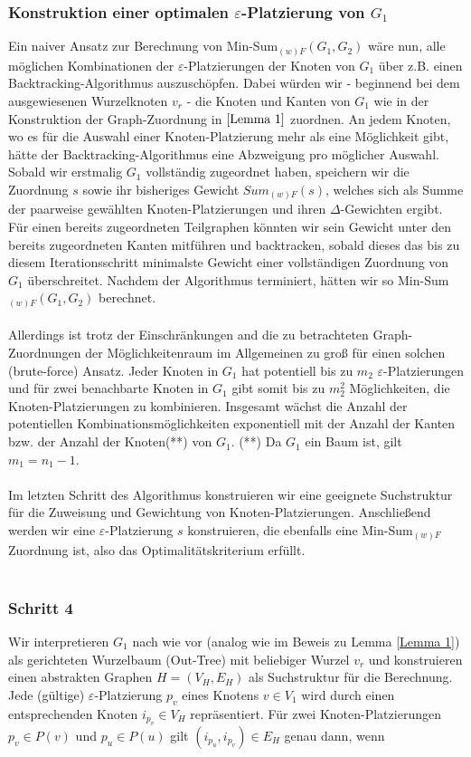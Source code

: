 \documentclass[a4paper, 12pt, twoside]{article}
\theoremstyle{Format1} %
\begin{document}
\subsubsection{Konstruktion einer optimalen $\varepsilon$-Platzierung von $G_1$}
Ein naiver Ansatz zur Berechnung von Min-Sum$_{(w)F}(G_1,G_2)$ wäre nun, alle möglichen Kombinationen der $\varepsilon$-Platzierungen der Knoten von $G_1$ über z.B. einen Backtracking-Algorithmus auszuschöpfen.
Dabei würden wir - beginnend bei dem ausgewiesenen Wurzelknoten $v_r$ - die Knoten und Kanten von $G_1$ wie in der Konstruktion der Graph-Zuordnung in $\ref{Lemma 1}$ zuordnen.
An jedem Knoten, wo es für die Auswahl einer Knoten-Platzierung mehr als eine Möglichkeit gibt, hätte der Backtracking-Algorithmus eine Abzweigung pro möglicher Auswahl.
Sobald wir erstmalig $G_1$ vollständig zugeordnet haben, speichern wir die Zuordnung $s$ sowie ihr bisheriges Gewicht $Sum_{(w)F}(s)$, welches sich als Summe der
paarweise gewählten Knoten-Platzierungen und ihren $\Delta$-Gewichten ergibt.
Für einen bereits zugeordneten Teilgraphen könnten wir sein Gewicht unter den bereits zugeordneten Kanten mitführen und backtracken, sobald dieses das bis zu diesem Iterationsschritt
minimalste Gewicht einer vollständigen Zuordnung von $G_1$ überschreitet. Nachdem der Algorithmus terminiert, hätten wir so Min-Sum$_{(w)F}(G_1,G_2)$ berechnet.
\\
\\
Allerdings ist trotz der Einschränkungen and die zu betrachteten Graph-Zuordnungen der Möglichkeitenraum im Allgemeinen zu groß
für einen solchen (brute-force) Ansatz.
Jeder Knoten in $G_1$ hat potentiell bis zu $m_2$ $\varepsilon$-Platzierungen und für
zwei benachbarte Knoten in $G_1$ gibt somit bis zu $m_2^2$ Möglichkeiten, die Knoten-Platzierungen zu kombinieren.
Insgesamt wächst die Anzahl der potentiellen Kombinationsmöglichkeiten exponentiell mit der Anzahl der Kanten bzw. der Anzahl der Knoten(**) von $G_1$.
(**) Da $G_1$ ein Baum ist, gilt $m_1 = n_1-1$.
\\
\\
Im letzten Schritt des Algorithmus konstruieren wir eine geeignete Suchstruktur für die Zuweisung und Gewichtung von Knoten-Platzierungen.
Anschließend werden wir eine $\varepsilon$-Platzierung $s$ konstruieren, die ebenfalls eine Min-Sum$_{(w)F}$ Zuordnung ist, also das Optimalitätskriterium erfüllt.
\\
\\
\subsubsection{Schritt 4}
Wir interpretieren $G_1$ nach wie vor (analog wie im Beweis zu Lemma \ref{Lemma 1}) als gerichteten Wurzelbaum (Out-Tree) mit beliebiger Wurzel $v_r$ und
konstruieren einen abstrakten Graphen $H = (V_H, E_H)$ als Suchstruktur für die Berechnung.
Jede (gültige) $\varepsilon$-Platzierung $p_v$ eines Knotens $v \in V_1$ wird durch einen entsprechenden Knoten $i_{p_v} \in V_H$ repräsentiert.
Für zwei Knoten-Platzierungen $p_v \in P(v)$ und $p_u \in P(u)$ gilt $(i_{p_u},i_{p_v}) \in E_H$ genau dann, wenn
\end{document}
